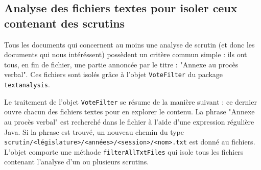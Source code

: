 \subsection[Analyse des fichiers textes pour isoler les scrutins]{Analyse des fichiers textes pour isoler ceux contenant des scrutins}

Tous les documents qui concernent au moins une analyse de scrutin (et donc les documents qui nous intéréssent) possèdent un critère commun simple : ils ont tous, en fin de fichier, une partie annoncée par le titre : "Annexe au procès verbal". Ces fichiers sont isolés grâce à l'objet \verb|VoteFilter| du package \verb|textanalysis|.

Le traitement de l'objet \verb|VoteFilter| se résume de la manière suivant : ce dernier ouvre chacun des fichiers textes pour en explorer le contenu. La phrase "Annexe au procès verbal" est recherché dans le fichier à l'aide d'une expression régulière Java. Si la phrase est trouvé, un nouveau chemin du type \verb|scrutin/<législature>/<années>/<session>/<nom>.txt| est donné au fichiers. L'objet comporte une méthode \verb|filterAllTxtFiles| qui isole tous les fichiers contenant l'analyse d'un ou plusieurs scrutins.
